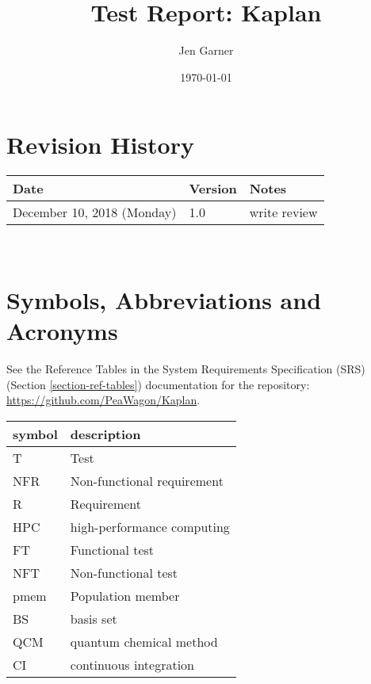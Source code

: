\documentclass[12pt, titlepage]{article}
\begin{document}
\title{Test Report: Kaplan} 
\author{Jen Garner}
\date{\today}
	
\maketitle


\section{Revision History}

\begin{tabularx}{\textwidth}{p{3cm}p{2cm}X}
\toprule {\bf Date} & {\bf Version} & {\bf Notes}\\
\midrule
December 10, 2018 (Monday) & 1.0 & write review \\
\bottomrule
\end{tabularx}

~\newpage

\section{Symbols, Abbreviations and Acronyms}

See the Reference Tables in the System Requirements Specification (SRS) 
(Section \ref{section-ref-tables}) documentation for the repository: 
\url{https://github.com/PeaWagon/Kaplan}.

\renewcommand{\arraystretch}{1.2}
\begin{tabular}{l l} 
  \toprule		
  \textbf{symbol} & \textbf{description}\\
  \midrule 
  T & Test\\
  NFR & Non-functional requirement \\
  R & Requirement \\
  HPC & high-performance computing \\
  FT & Functional test \\
  NFT & Non-functional test \\
  pmem & Population member \\
  BS & basis set \\
  QCM & quantum chemical method \\
  CI & continuous integration \\
  \bottomrule
\end{tabular}\\

\newpage
\end{document}
